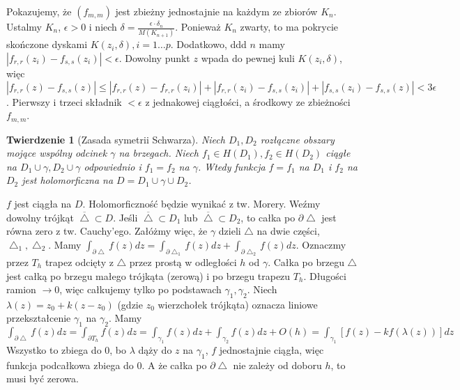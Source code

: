\documentclass[11pt]{article}
\newcommand{\abs}[1]{\left|#1\right|} %
\newcommand{\closure}[1]{\overline{#1}} %
\theoremstyle{plain}
\newtheorem*{theorem}{Twierdzenie}
\theoremstyle{definition}
\theoremstyle{remark}
\let\oldendproof\endproof
\renewenvironment{proof}[1][\proofname]{
  \oldproof[\textsc{\small #1}]
}{\oldendproof}
\begin{document}
\begin{proof}
  Pokazujemy, że $ (f_{m,m}) $ jest zbieżny jednostajnie na każdym ze zbiorów $ K_n $.
  Ustalmy $ K_n $, $ \epsilon > 0 $ i niech $ \delta = \frac{\epsilon \cdot \delta_n}{M(K_{n+1})} $.
  Ponieważ $ K_n $ zwarty, to ma pokrycie skończone dyskami $ K(z_i, \delta), i = 1 \dots p $.
  Dodatkowo, ddd $ n $ mamy $ \abs{f_{r,r}(z_i) - f_{s,s}(z_i)} < \epsilon $.
  Dowolny punkt $ z $ wpada do pewnej kuli $ K(z_i, \delta) $, więc
  $ \abs{f_{r,r}(z) - f_{s,s}(z)} \leq \abs{f_{r,r}(z) - f_{r,r}(z_i)} + \abs{f_{r,r}(z_i) - f_{s,s}(z_i)} + \abs{f_{s,s}(z_i) - f_{s,s}(z)} < 3\epsilon $.
  Pierwszy i trzeci składnik $ < \epsilon $ z jednakowej ciągłości, a środkowy ze zbieżności $ f_{m,m} $.
\end{proof}

\begin{theorem}[Zasada symetrii Schwarza]
  Niech $ D_1, D_2 $ rozłączne obszary mojące wspólny odcinek $ \gamma $ na brzegach.
  Niech $ f_1 \in H(D_1), f_2 \in H(D_2) $ ciągłe na $ D_1 \cup \gamma, D_2 \cup \gamma $ odpowiednio i $ f_1 = f_2 $ na $ \gamma $.
  Wtedy funkcja $ f = f_1 $ na $ D_1 $ i $ f_2 $ na $ D_2 $ jest holomorficzna na $ D = D_1 \cup \gamma \cup D_2 $.
\end{theorem}

\begin{proof}
  $ f $ jest ciągła na $ D $.
  Holomorficzność będzie wynikać z tw. Morery.
  Weźmy dowolny trójkąt $ \closure{\bigtriangleup} \subset D $.
  Jeśli $ \closure{\bigtriangleup} \subset D_1 $ lub $ \closure{\bigtriangleup} \subset D_2 $, to całka po $ \partial\bigtriangleup $ jest równa zero z tw. Cauchy’ego.
  Załóżmy więc, że $ \gamma $ dzieli $ \bigtriangleup $ na dwie części, $ \bigtriangleup_1, \bigtriangleup_2 $.
  Mamy $ \int_{\partial\bigtriangleup} f(z) dz = \int_{\partial\bigtriangleup_1} f(z) dz + \int_{\partial\bigtriangleup_2} f(z) dz $.
  Oznaczmy przez $ T_h $ trapez odcięty z $ \bigtriangleup $ przez prostą w odległości $ h $ od $ \gamma $.
  Całka po brzegu $ \bigtriangleup $ jest całką po brzegu małego trójkąta (zerową) i po brzegu trapezu $ T_h $.
  Długości ramion $ \to 0 $, więc całkujemy tylko po podstawach $ \gamma_1, \gamma_2 $.
  Niech $ \lambda(z) = z_0 + k(z - z_0) $ (gdzie $ z_0 $ wierzchołek trójkąta) oznacza liniowe przekształcenie $ \gamma_1 $ na $ \gamma_2 $.
  Mamy
  $
  \int_{\partial\bigtriangleup} f(z) dz =
  \int_{\partial T_h} f(z) dz =
  \int_{\gamma_1} f(z) dz + \int_{\gamma_2} f(z) dz + O(h) =
  \int_{\gamma_1} \left[ f(z) - kf(\lambda(z)) \right] dz
  $
  Wszystko to zbiega do $ 0 $, bo $ \lambda $ dąży do $ z $ na $ \gamma_1 $, $ f $ jednostajnie ciągła, więc funkcja podcałkowa zbiega do $ 0 $.
  A że całka po $ \partial\bigtriangleup $ nie zależy od doboru $ h $, to musi być zerowa.
\end{proof}
\end{document}
